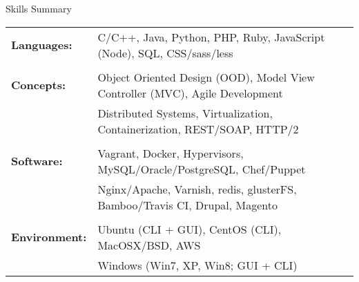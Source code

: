 \documentclass{resume} %
\begin{document}

\begin{rSection}{Skills Summary}

\begin{tabular}{ @{} >{\bfseries}l @{\hspace{6ex}} l }
Languages: & C/C++, Java, Python, PHP, Ruby, JavaScript (Node), SQL, CSS/sass/less  \\\\ 
Concepts: & Object Oriented Design (OOD), Model View Controller (MVC), Agile Development  \\
 & Distributed Systems, Virtualization, Containerization, REST/SOAP, HTTP/2  \\\\
Software: & Vagrant, Docker, Hypervisors, MySQL/Oracle/PostgreSQL, Chef/Puppet\\
 & Nginx/Apache, Varnish, redis, glusterFS, Bamboo/Travis CI, Drupal, Magento  \\\\
Environment: & Ubuntu (CLI + GUI), CentOS (CLI), MacOSX/BSD, AWS \\
 & Windows (Win7, XP, Win8; GUI + CLI)

\end{tabular}

\end{rSection}


\end{document}
